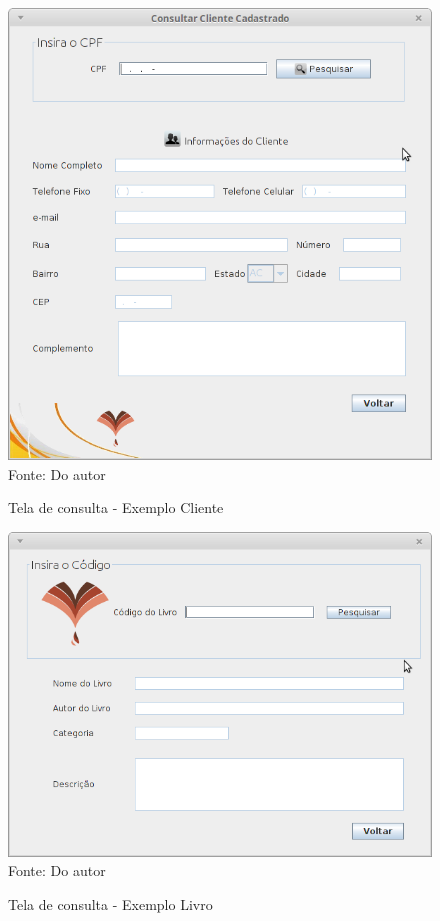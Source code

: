 \begin{figure}[H]
	\centering 
	\caption{Tela de consulta - Exemplo Cliente}
	\label{consulta_cliente}
	\includegraphics[scale = 0.6]{imagens/tela-consulta-cliente.png}
	\\Fonte: Do autor
\end{figure}


\begin{figure}[H]
	\centering 
	\caption{Tela de consulta - Exemplo Livro}
	\label{consulta_livro}
	\includegraphics[scale = 0.6]{imagens/tela-consulta-livro.png}
	\\Fonte: Do autor
\end{figure}



